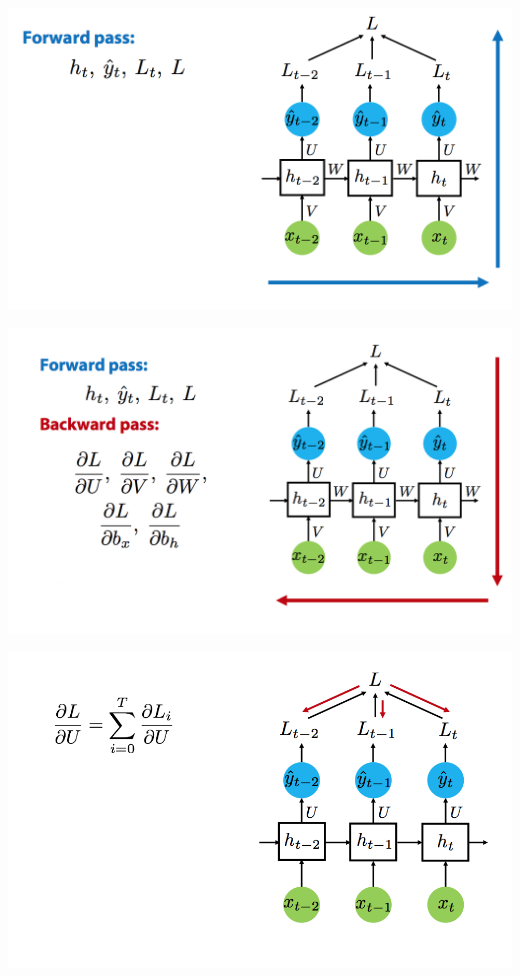 \documentclass[notes,12pt, aspectratio=169]{beamer}
\begin{document}
\begin{frame}
\begin{center}
	\includegraphics[width=.9\linewidth]{rnn2.png}
\end{center}
\end{frame}


\begin{frame}
\begin{center}
	\includegraphics[width=.9\linewidth]{rnn3.png}
\end{center}
\end{frame}


\begin{frame}
\begin{center}
	\includegraphics[width=.9\linewidth]{rnn4.png}
\end{center}
\end{frame}
\end{document}
